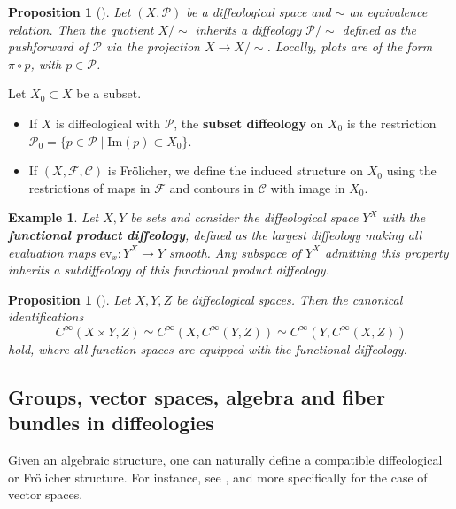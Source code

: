 \documentclass{amsart}
\newcounter{thm}
\newcounter{ex}
\newcounter{re}
\newtheorem{Proposition}[thm]{Proposition}
\newtheorem{example}[thm]{Example}
\begin{document}
\begin{Proposition}[\cite{Igdiff, Sou}] \label{quotient}
	Let $(X, \mathcal{P})$ be a diffeological space and $\sim$ an equivalence relation. Then the quotient $X/\sim$ inherits a diffeology $\mathcal{P}/\sim$ defined as the pushforward of $\mathcal{P}$ via the projection $X \to X/\sim$. Locally, plots are of the form $\pi \circ p$, with $p \in \mathcal{P}$.
\end{Proposition}

Let $X_0 \subset X$ be a subset.

\begin{itemize}
	\item If $X$ is diffeological with $\mathcal{P}$, the \textbf{subset diffeology} on $X_0$ is the restriction $\mathcal{P}_0 = \{ p \in \mathcal{P} \mid \mathrm{Im}(p) \subset X_0 \}$.
	
	\item If $(X, \mathcal{F}, \mathcal{C})$ is Fr\"olicher, we define the induced structure on $X_0$ using the restrictions of maps in $\mathcal{F}$ and contours in $\mathcal{C}$ with image in $X_0$.
\end{itemize}

\begin{example}
	Let $X, Y$ be sets and consider the diffeological space $Y^X$ with the \textbf{functional product diffeology}, defined as the largest diffeology making all evaluation maps $\mathrm{ev}_x: Y^X \to Y$ smooth. Any subspace of $Y^X$ admitting this property inherits a subdiffeology of this functional product diffeology.
\end{example}

\begin{Proposition}[\cite{Igdiff}] \label{cvar}
	Let $X, Y, Z$ be diffeological spaces. Then the canonical identifications
	\[
	C^\infty(X \times Y, Z) \simeq C^\infty(X, C^\infty(Y, Z)) \simeq C^\infty(Y, C^\infty(X, Z))
	\]
	hold, where all function spaces are equipped with the functional diffeology.
\end{Proposition}
\subsection{Groups, vector spaces, algebra and fiber bundles in diffeologies}

Given an algebraic structure, one can naturally define a compatible diffeological or Fr\"olicher structure. For instance, see \cite{Les, Ma2013}, and more specifically \cite[pp.~66--68]{Igdiff} for the case of vector spaces. 
\end{document}
